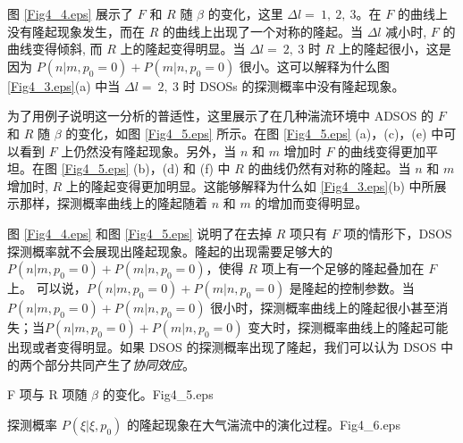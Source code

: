 \documentclass[master]{thesis-uestc}
\begin{document}
图 \ref{Fig4_4.eps} 展示了 $F$ 和 $R$ 随 $\beta$ 的变化，这里 $\Delta l=~1,~2,~3$。在 $F$ 的曲线上没有隆起现象发生，而在 $R$ 的曲线上出现了一个对称的隆起。当 $\Delta l$ 减小时, $F$ 的曲线变得倾斜, 而 $R$ 上的隆起变得明显。当 $\Delta l=~2,~3$ 时 $R$ 上的隆起很小，这是因为 $P(n|m,p_0=0)+P(m|n,p_0=0)$ 很小。这可以解释为什么图 \ref{Fig4_3.eps}(a) 中当 $\Delta l=~2, ~3$ 时 DSOSs 的探测概率中没有隆起现象。

为了用例子说明这一分析的普适性，这里展示了在几种湍流环境中 ADSOS 的 $F$ 和 $R$ 随 $\beta$ 的变化，如图 \ref{Fig4_5.eps} 所示。在图 \ref{Fig4_5.eps} (a)，(c)，(e) 中可以看到 $F$ 上仍然没有隆起现象。另外，当 $n$ 和 $m$ 增加时 $F$ 的曲线变得更加平坦。在图 \ref{Fig4_5.eps} (b)，(d) 和 (f) 中 $R$ 的曲线仍然有对称的隆起。当 $n$ 和 $m$ 增加时, $R$ 上的隆起变得更加明显。这能够解释为什么如 \ref{Fig4_3.eps}(b) 中所展示那样，探测概率曲线上的隆起随着 $n$ 和 $m$ 的增加而变得明显。

图 \ref{Fig4_4.eps} 和图 \ref{Fig4_5.eps} 说明了在去掉 $R$ 项只有 $F$ 项的情形下，DSOS 探测概率就不会展现出隆起现象。隆起的出现需要足够大的 $P(n|m,p_0=0)+P(m|n,p_0=0)$，使得 $R$ 项上有一个足够的隆起叠加在 $F$ 上。 可以说，$P(n|m,p_0=0)+P(m|n,p_0=0)$ 是隆起的控制参数。当$P(n|m,p_0=0)+P(m|n,p_0=0)$ 很小时，探测概率曲线上的隆起很小甚至消失；当$P(n|m,p_0=0)+P(m|n,p_0=0)$ 变大时，探测概率曲线上的隆起可能出现或者变得明显。如果 DSOS 的探测概率出现了隆起，我们可以认为 DSOS 中的两个部分共同产生了\emph{协同效应}。

\begin{pics}[H]{ F 项与 R 项随 $\beta$ 的变化。}{Fig4_5.eps}
\end{pics}

\begin{pics}[H]{ 探测概率 $P(\xi|\xi,p_0)$ 的隆起现象在大气湍流中的演化过程。}{Fig4_6.eps}
\end{pics}
\end{document}
